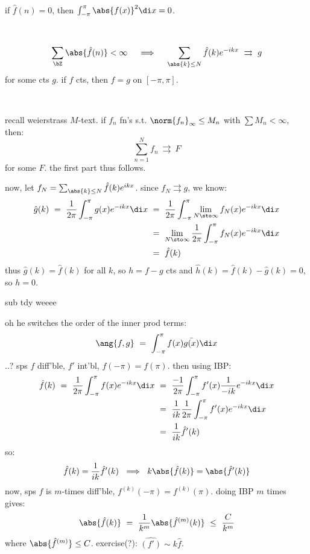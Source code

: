 \begin{pf}
	if $\hat{f}(n)=0$, then $\int_{-\pi}^{\pi}\abs{f(x)}^{2}\di x = 0$.
\end{pf} \

\begin{crll}
	\begin{equation*}
		\sum_{\bZ}\abs{\hat{f}(n)}<\infty \quad \implies \quad
		\sum_{\abs{k}\leq N}\hat{f}(k)e^{-ikx} \ \rightrightarrows \ g
	\end{equation*}
	for some cts $g$.
	if $f$ cts, then $f=g$ on $[-\pi,\pi]$.
\end{crll} \

\begin{pf}
	recall weierstrass $M$-text.
	if $f_{n}$ fn's s.t. $\norm{f_{n}}_{\infty}\leq M_{n}$ with $\sum M_{n}<\infty$, then:
	\begin{equation*}
		\sum_{n=1}^{N}f_{n} \ \rightrightarrows \ F
	\end{equation*}
	for some $F$. the first part thus follows.

	now, let $f_{N}=\sum_{\abs{k}\leq N}\hat{f}(k)e^{ikx}$.
	since $f_{N}\rightrightarrows g$, we know:
	\begin{align*}
		\hat{g}(k) \ = \ \frac{1}{2\pi}\int_{-\pi}^{\pi}g(x)e^{-ikx}\di x
		& \ = \ \frac{1}{2\pi}\int_{-\pi}^{\pi}\lim_{N\sto\infty}f_{N}(x)e^{-ikx}\di x \\
		& \ = \ \lim_{N\sto\infty}\frac{1}{2\pi}\int_{-\pi}^{\pi}f_{N}(x)e^{-ikx}\di x \\
		& \ = \ \hat{f}(k)
	\end{align*}
	thus $\hat{g}(k)=\hat{f}(k)$ for all $k$, so $h=f-g$ cts and
	$\hat{h}(k)=\hat{f}(k)-\hat{g}(k)=0$, so $h=0$.
\end{pf}

sub tdy weeee

oh he switches the order of the inner prod terms:
\begin{equation*}
	\ang{f,g} \ = \ \int_{-\pi}^{\pi}f(x)\bar{g(x)}\di x
\end{equation*}
..? sps $f$ diff'ble, $f'$ int'bl, $f(-\pi)=f(\pi)$. then using IBP:
\begin{align*}
	\hat{f}(k) \ = \ \frac{1}{2\pi}\int_{-\pi}^{\pi}f(x)e^{-ikx}\di x
	& \ = \ \frac{-1}{2\pi}\int_{-\pi}^{\pi}f'(x)\frac{1}{-ik}e^{-ikx}\di x \\
	& \ = \ \frac{1}{ik}\frac{1}{2\pi}\int_{-\pi}^{\pi}f'(x)e^{-ikx}\di x \\
	& \ = \ \frac{1}{ik}\hat{f}'(k)
\end{align*}
so:
\begin{equation*}
	\hat{f}(k) = \frac{1}{ik}\hat{f}'(k) \ \implies \ k\abs{\hat{f}(k)} = \abs{\hat{f}'(k)}
\end{equation*}
now, sps $f$ is $m$-times diff'ble, $f^{(k)}(-\pi)=f^{(k)}(\pi)$.
doing IBP $m$ times gives:
\begin{equation*}
	\abs{\hat{f}(k)} \ = \ \frac{1}{k^{m}}\abs{\hat{f}^{(m)}(k)} \ \leq \ \frac{C}{k^{m}}
\end{equation*}
where $\abs{\hat{f}^{(m)}}\leq C$.
exercise(?): $\hat{(f')}\sim k\hat{f}$.
